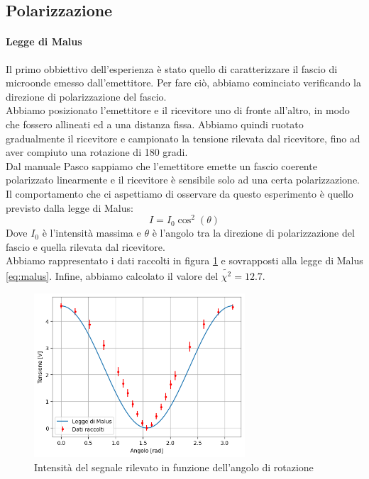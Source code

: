 \documentclass[letterpaper,12pt]{article}
\begin{document}
\subsection{Polarizzazione}
\paragraph*{Legge di Malus}
Il primo obbiettivo dell'esperienza è stato quello di caratterizzare il fascio di microonde emesso dall'emettitore.
Per fare ciò, abbiamo cominciato verificando la direzione di polarizzazione del fascio. \\
Abbiamo posizionato l'emettitore e il ricevitore uno di fronte all'altro, in modo che fossero
allineati ed a una distanza fissa. Abbiamo quindi ruotato gradualmente il ricevitore e campionato
la tensione rilevata dal ricevitore, fino ad aver compiuto una rotazione di 180 gradi.\\
Dal manuale Pasco sappiamo che l'emettitore emette un fascio coerente polarizzato linearmente
e il ricevitore è sensibile solo ad una certa polarizzazione. Il comportamento che ci aspettiamo
di osservare da questo esperimento è quello previsto dalla legge di Malus:
\begin{equation}
	I = I_0 \cos^2(\theta)
	\label{eq:malus}
\end{equation}
Dove $I_0$ è l'intensità massima e $\theta$ è l'angolo tra la direzione di polarizzazione del fascio e quella rilevata dal ricevitore.\\
Abbiamo rappresentato i dati raccolti in figura \ref{fig:polarizzazione} e sovrapposti alla legge di Malus \eqref{eq:malus}.
Infine, abbiamo calcolato il valore del $\tilde{\chi^2} = 12.7$.


\begin{figure}[h!]
	\centering
	\includegraphics[width = 0.7\textwidth]{polarizzazione.png}
	\caption{Intensità del segnale rilevato in funzione dell'angolo di rotazione}
	\label{fig:polarizzazione}
\end{figure}
\end{document}
